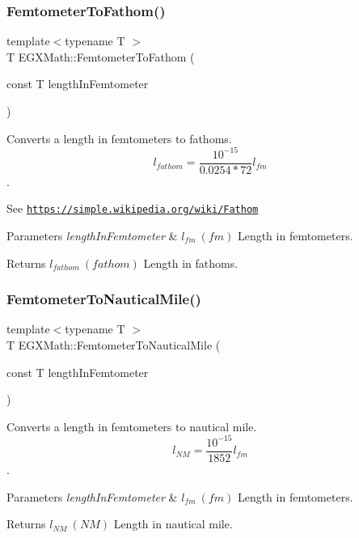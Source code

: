 \subsubsection{\texorpdfstring{Femtometer\+To\+Fathom()}{FemtometerToFathom()}}
{\footnotesize\ttfamily template$<$typename T $>$ \\
T E\+G\+X\+Math\+::\+Femtometer\+To\+Fathom (\begin{DoxyParamCaption}\item[{const T}]{length\+In\+Femtometer }\end{DoxyParamCaption})}



Converts a length in femtometers to fathoms. \[ l_{fathom}= \frac{10^{-15}}{0.0254 * 72} l_{fm} \]. 

See \href{https://simple.wikipedia.org/wiki/Fathom}{\tt https\+://simple.\+wikipedia.\+org/wiki/\+Fathom} 
\begin{DoxyParams}{Parameters}
{\em length\+In\+Femtometer} & $ l_{fm}\ (fm)$ Length in femtometers. \\
\hline
\end{DoxyParams}
\begin{DoxyReturn}{Returns}
$ l_{fathom}\ (fathom)$ Length in fathoms. 
\end{DoxyReturn}
\mbox{\label{group___e_g_x_math-_conversions-_length_conversions-_s_i-_femtometer-_nautical_gae44357e3e44868120d603cff76cefd77}} 
\subsubsection{\texorpdfstring{Femtometer\+To\+Nautical\+Mile()}{FemtometerToNauticalMile()}}
{\footnotesize\ttfamily template$<$typename T $>$ \\
T E\+G\+X\+Math\+::\+Femtometer\+To\+Nautical\+Mile (\begin{DoxyParamCaption}\item[{const T}]{length\+In\+Femtometer }\end{DoxyParamCaption})}



Converts a length in femtometers to nautical mile. \[ l_{NM}= \frac{10^{-15}}{1852} l_{fm} \]. 


\begin{DoxyParams}{Parameters}
{\em length\+In\+Femtometer} & $ l_{fm}\ (fm)$ Length in femtometers. \\
\hline
\end{DoxyParams}
\begin{DoxyReturn}{Returns}
$ l_{NM}\ (NM)$ Length in nautical mile. 
\end{DoxyReturn}
